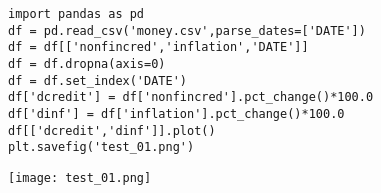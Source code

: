 \documentclass[12pt,fleqn]{article}\usepackage{../../common}
\begin{document}
\begin{verbatim}
import pandas as pd
df = pd.read_csv('money.csv',parse_dates=['DATE'])
df = df[['nonfincred','inflation','DATE']]
df = df.dropna(axis=0)
df = df.set_index('DATE')
df['dcredit'] = df['nonfincred'].pct_change()*100.0
df['dinf'] = df['inflation'].pct_change()*100.0
df[['dcredit','dinf']].plot()
plt.savefig('test_01.png')
\end{verbatim}

\texttt{[image: test\_01.png]}
\end{document}
